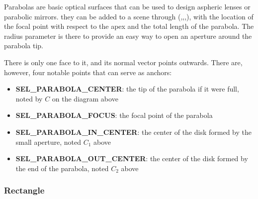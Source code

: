 Parabolas are basic optical surfaces that can be used to design aspheric lenses or parabolic mirrors. they can be added to a scene through (,,,), with  the location of the focal point with respect to the apex and  the total length of the parabola. The radius parameter  is there to provide an easy way to open an aperture around the parabola tip.
\begin{center}\end{center}
There is only one face to it, and its normal vector points outwards. There are, however, four notable points that can serve as anchors:
\begin{itemize}
	\item \textbf{SEL\_PARABOLA\_CENTER}: the tip of the parabola if it were full, noted by $C$ on the diagram above
	\item \textbf{SEL\_PARABOLA\_FOCUS}: the focal point of the parabola
	\item \textbf{SEL\_PARABOLA\_IN\_CENTER}: the center of the disk formed by the small aperture, noted $C_1$ above
	\item \textbf{SEL\_PARABOLA\_OUT\_CENTER}: the center of the disk formed by the end of the parabola, noted $C_2$ above
\end{itemize}

\newpage
\subsubsection{Rectangle}


